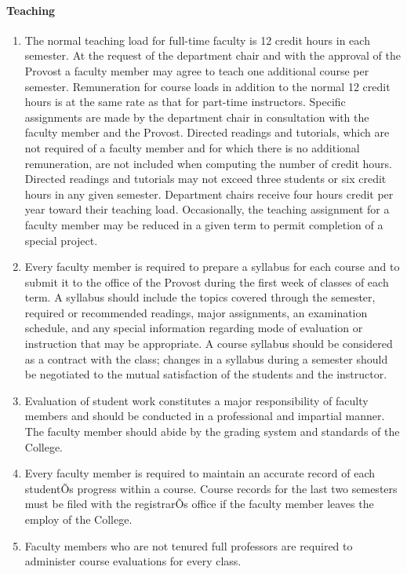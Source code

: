 \documentclass[letterpaper, 11pt]{article}
\begin{document}
			\paragraph{Teaching}
				\begin{enumerate}[label=\alph*)]
					\item{The normal teaching load for full-time faculty is 12 credit hours in each semester.  At the request of the department chair and with the approval of the Provost a faculty member may agree to teach one additional course per semester.  Remuneration for course loads in addition to the normal 12 credit hours is at the same rate as that for part-time instructors.  Specific assignments are made by the department chair in consultation with the faculty member and the Provost.  Directed readings and tutorials, which are not required of a faculty member and for which there is no additional remuneration, are not included when computing the number of credit hours.  Directed readings and tutorials may not exceed three students or six credit hours in any given semester.  Department chairs receive four hours credit per year toward their teaching load.  Occasionally, the teaching assignment for a faculty member may be reduced in a given term to permit completion of a special project.}
					\item{Every faculty member is required to prepare a syllabus for each course and to submit it to the office of the Provost during the first week of classes of each term.  A syllabus should include the topics covered through the semester, required or recommended readings, major assignments, an examination schedule, and any special information regarding mode of evaluation or instruction that may be appropriate.  A course syllabus should be considered as a contract with the class; changes in a syllabus during a semester should be negotiated to the mutual satisfaction of the students and the instructor.}
					\item{Evaluation of student work constitutes a major responsibility of faculty members and should be conducted in a professional and impartial manner.  The faculty member should abide by the grading system and standards of the College.}
					\item{Every faculty member is required to maintain an accurate record of each studentÕs progress within a course.  Course records for the last two semesters must be filed with the registrarÕs office if the faculty member leaves the employ of the College.}
					\item{Faculty members who are not tenured full professors are required to administer course evaluations for every class.}
				\end{enumerate}
\end{document}
